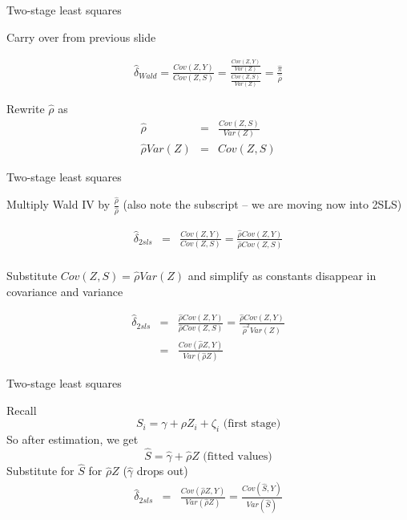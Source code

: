 \documentclass{beamer}
\begin{document}
\begin{frame}{Two-stage least squares}

Carry over from previous slide

\bigskip

		\begin{eqnarray*}
		\widehat{\delta}_{Wald} = \frac{ Cov(Z,Y)} {Cov(Z,S)} = \frac{ \frac{Cov(Z,Y)}{Var(Z)}}{ \frac{Cov(Z,S)}{Var(Z)}} = \frac{\widehat{\pi}}{\widehat{\rho}}
		\end{eqnarray*}

\bigskip

Rewrite $\widehat{\rho}$ as\begin{eqnarray*}
	\widehat{\rho} &=&  \frac{Cov(Z,S)}{Var(Z)} \\
\widehat{\rho}Var(Z)	&=& Cov(Z,S) 
	\end{eqnarray*}

\end{frame}


\begin{frame}{Two-stage least squares}

Multiply Wald IV by $\frac{\widehat{\rho}}{\widehat{\rho}}$  (also note the subscript -- we are moving now into 2SLS)

	\begin{eqnarray*}
	\widehat{\delta}_{2sls} &=& \frac{ Cov(Z,Y)}{ Cov(Z,S)} = \frac{\widehat{\rho}Cov(Z,Y)}{\widehat{\rho}Cov(Z,S)} \\
	\end{eqnarray*}

Substitute $Cov(Z,S) = \widehat{\rho}Var(Z) $ and simplify as constants disappear in covariance and variance

	\begin{eqnarray*}
	\widehat{\delta}_{2sls} &=& \frac{\widehat{\rho}Cov(Z,Y)}{\widehat{\rho}Cov(Z,S)} = \frac{\widehat{\rho}Cov(Z,Y)}{\widehat{\rho}^2Var(Z)}  \\
	&=&\frac{Cov(\widehat{\rho}Z,Y)}{Var(\widehat{\rho}Z)} 
	\end{eqnarray*}

\end{frame}

\begin{frame}{Two-stage least squares}
	
Recall $$ S_i = \gamma + \rho{Z}_i + \zeta_i \text{ (first stage)} $$So after estimation, we get $$\widehat{S}=\widehat{\gamma} + \widehat{\rho}Z \text{ (fitted values)}$$  
Substitute for $\widehat{S}$ for $\widehat{\rho}Z$ ($\widehat{\gamma}$ drops out)
		\begin{eqnarray*}
		\widehat{\delta}_{2sls} &=& \frac{Cov(\widehat{\rho}Z,Y)}{Var(\widehat{\rho}Z)} =  \frac{Cov(\widehat{S},Y)}{Var(\widehat{S})}
		\end{eqnarray*}
		
		

\end{frame}
\end{document}

